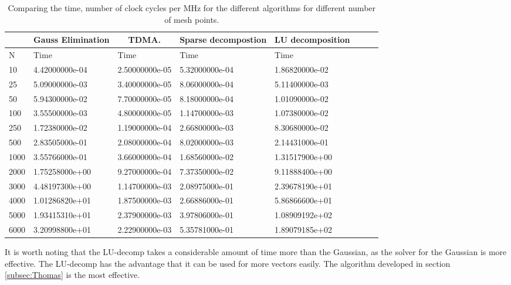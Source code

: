 \documentclass[11pt,a4paper,english]{article}
\numberwithin{equation}{section}
\begin{document}
\begin{table}[H]
\centering
\caption{Comparing the time, number of clock cycles per MHz for the
different algorithms for different number of mesh points. }
\vspace{3mm}
\begin{tabular}{|l|l|l|l|l|l|l|l|}
\hline
\multicolumn{1}{|c|}{ } & \multicolumn{1}{|c|}{Gauss Elimination} & \multicolumn{1}{|c|}{TDMA.} & \multicolumn{1}{|c|}{Sparse decompostion} & \multicolumn{1}{|c|}{LU decomposition}  \\
\hline
N & Time & Time & Time & Time  \\
\hline
10 & 4.42000000e-04 &   2.50000000e-05 &   5.32000000e-04 & 1.86820000e-02 \\
25 & 5.09000000e-03 &   3.40000000e-05 &   8.06000000e-04 & 5.11400000e-03 \\
50 & 5.94300000e-02 &   7.70000000e-05 &   8.18000000e-04 & 1.01090000e-02 \\
100 & 3.55500000e-03 &   4.80000000e-05 &   1.14700000e-03 & 1.07380000e-02 \\
250 & 1.72380000e-02 &   1.19000000e-04 &   2.66800000e-03 & 8.30680000e-02 \\
500 & 2.83505000e-01 &   2.08000000e-04 &   8.02000000e-03 & 2.14431000e-01 \\
1000 & 3.55766000e-01 &   3.66000000e-04 &   1.68560000e-02 & 1.31517900e+00 \\
2000 & 1.75258000e+00 &   9.27000000e-04 &   7.37350000e-02 & 9.11888400e+00 \\
3000 & 4.48197300e+00 &   1.14700000e-03 &   2.08975000e-01 & 2.39678190e+01 \\
4000 & 1.01286820e+01 &   1.87500000e-03 &   2.66886000e-01 & 5.86866600e+01 \\
5000 & 1.93415310e+01 &   2.37900000e-03 &   3.97806000e-01 & 1.08909192e+02 \\
6000 & 3.20998800e+01 &   2.22900000e-03 &   5.35781000e-01 & 1.89079185e+02 \\
\hline
\end{tabular}
\label{tab:time}
\end{table}

It is worth noting that the 
LU-decomp takes a considerable amount of time more than the Gaussian,
as the solver for the Gaussian is more effective. The LU-decomp has
the advantage that it can be used for more vectors easily. 
The algorithm developed in section \ref{subsec:Thomas} is 
the most effective.
\end{document}
